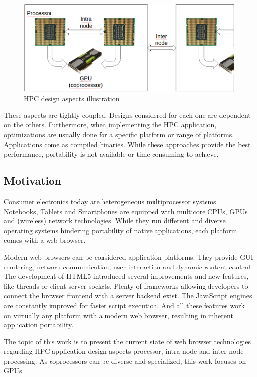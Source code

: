 \begin{figure}[htp]
  \begin{center}
    \includegraphics[width=0.9\columnwidth]{resources/hpc_aspects.png}
  \end{center}
  \caption{HPC design aspects illustration}
  \label{fig:hpcaspects}
\end{figure}

These aspects are tightly coupled. Designs considered for each one are dependent on the others. Furthermore, when implementing the HPC application, optimizations are usually done for a specific platform or range of platforms. Applications come as compiled binaries. While these approaches provide the best performance, portability is not available or time-consuming to achieve.


\subsection{Motivation}

Consumer electronics today are heterogeneous multiprocessor systems. Notebooks, Tablets and Smartphones are equipped with multicore CPUs, GPUs and (wireless) network technologies. While they run different and diverse operating systems hindering portability of native applications, each platform comes with a web browser.

Modern web browsers can be considered application platforms. They provide GUI rendering, network communication, user interaction and dynamic content control. The development of HTML5 introduced several improvements and new features, like threads or client-server sockets. Plenty of frameworks allowing developers to connect the browser frontend with a server backend exist. The JavaScript engines are constantly improved for faster script execution. And all these features work on virtually any platform with a modern web browser, resulting in inherent application portability.

The topic of this work is to present the current state of web browser technologies regarding HPC application design aspects processor, intra-node and inter-node processing. As coprocessors can be diverse and specialized, this work focuses on GPUs.


